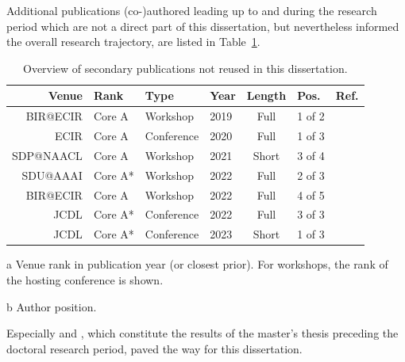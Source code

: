 Additional publications (co-)authored leading up to and during the research period which are not a direct part of this dissertation, but nevertheless informed the overall research trajectory, are listed in Table~\ref{tab:secondarypublicationoverview}.

\begin{table}[h]
  \caption{Overview of secondary publications not reused in this dissertation.}
  \label{tab:secondarypublicationoverview}
  \centering
  \begin{threeparttable}
  \begin{tabular}{rlllclr}
    \hline
    Venue & Rank\tnote{a} & Type      & Year & Length & Pos.\tnote{b} & Ref. \\
    \hline
    BIR@ECIR  & Core A  & Workshop    & 2019 & Full   & 1 of 2 & \cite{Saier2019} \\
    ECIR      & Core A  & Conference  & 2020 & Full   & 1 of 3 & \cite{Saier2020a} \\
    SDP@NAACL & Core A  & Workshop    & 2021 & Short  & 3 of 4 & \cite{Krause2021} \\
    SDU@AAAI  & Core A* & Workshop    & 2022 & Full   & 2 of 3 & \cite{Shapiro2022} \\
    BIR@ECIR  & Core A  & Workshop    & 2022 & Full   & 4 of 5 & \cite{Faerber2022bir} \\
    JCDL      & Core A* & Conference  & 2022 & Full   & 3 of 3 & \cite{Nishioka2022} \\
    JCDL      & Core A* & Conference  & 2023 & Short  & 1 of 3 & \cite{Saier2023cocon} \\
    \hline
    \end{tabular}
    \begin{tablenotes}
      \item[a] Venue rank in publication year (or closest prior). For workshops, the rank of the hosting conference is shown.
      \item[b] Author position.
    \end{tablenotes}
    \end{threeparttable}
\end{table}

Especially \cite{Saier2019} and \cite{Saier2020a}, which constitute the results of the master's thesis preceding the doctoral research period, paved the way for this dissertation.
